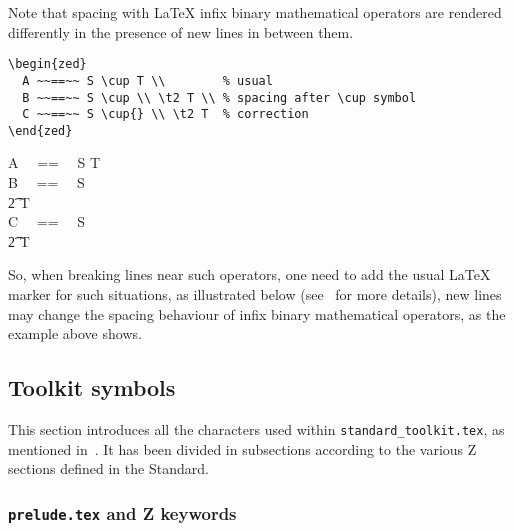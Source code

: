 \documentclass{article}
\newcommand{\emfile}[1]{\texttt{#1}}%
\newcommand{\preludefile}{\emfile{prelude.tex}}
\newcommand{\stdtkfile}{\emfile{standard\_toolkit.tex}}
\def\gives{\endquote\endgroup\egroup}
\begin{document}
Note that spacing with \LaTeX{} infix binary mathematical operators are rendered
differently in the presence of new lines in between them.
%
\begin{demo}
\begin{verbatim}
\begin{zed}
  A ~~==~~ S \cup T \\        % usual
  B ~~==~~ S \cup \\ \t2 T \\ % spacing after \cup symbol
  C ~~==~~ S \cup{} \\ \t2 T  % correction
\end{zed}
\end{verbatim}
\gives
\begin{zed}
   A ~~==~~ S \cup T \\          %
   B ~~==~~ S \cup \\ \t2 T \\   %
   C ~~==~~ S \cup{} \\ \t2 T    %
\end{zed}
\end{demo}
%
So, when breaking lines
near such operators, one need to add the usual \LaTeX{} marker for such situations,
as illustrated below (see~\cite[p.525, Table~8.7]{latexcomp} for more details), new
lines may change the spacing behaviour of infix binary mathematical operators,
as the example above shows.

\subsection{Toolkit symbols}\label{sec:symbol-toolkit}

This section introduces all the characters used within \stdtkfile, as mentioned
in~\cite[Appendix~B]{isoz}. It has been divided in subsections according to the various
Z sections defined in the Standard.

\subsubsection{\preludefile{} and Z keywords}\label{sec:symbol-toolkit-prelude}
\end{document}
